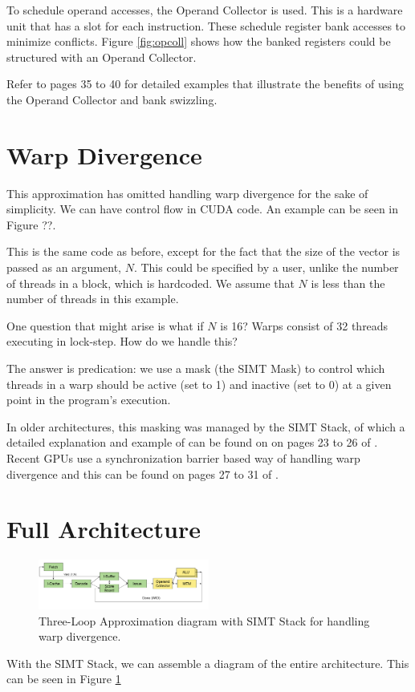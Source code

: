 To schedule operand accesses, the Operand Collector is used. This is a hardware unit that
has a slot for each instruction. These schedule register bank accesses to minimize conflicts.
Figure \ref{fig:opcoll} shows how the banked registers could be structured with an Operand Collector.

Refer to \cite{aamodt2018general} pages 35 to 40 for detailed examples that illustrate the benefits of using
the Operand Collector and bank swizzling.

\section{Warp Divergence}

This approximation has omitted handling warp divergence for the sake of simplicity.
We can have control flow in CUDA code. An example can be seen in Figure ??.

This is the same code as before, except for the fact that the size of the vector is passed
as an argument, $N$. This could be specified by a user, unlike the number of threads in a block,
which is hardcoded. We assume that $N$ is less than the number of threads in this example.

One question that might arise is what if $N$ is 16? Warps consist of 32 threads
executing in lock-step. How do we handle this?

The answer is predication: we use a mask (the SIMT Mask) to control which threads in a warp
should be active (set to 1) and inactive (set to 0) at a given point in the program's execution.

In older architectures, this masking was managed by the SIMT Stack, of which
a detailed explanation and example of can be found on
on pages 23 to 26 of \cite{aamodt2018general}. Recent GPUs use a synchronization barrier based
way of handling warp divergence and this can be found on pages 27 to 31 of \cite{aamodt2018general}.

\section{Full Architecture}


\begin{figure}[h]
    \centering
    \includegraphics[width=0.5\textwidth]{assets/3.png}
    \caption{Three-Loop Approximation diagram with SIMT Stack for handling warp divergence.}
    \label{fig:warpthreeloop}
\end{figure}

With the SIMT Stack, we can assemble a diagram of the entire architecture.
This can be seen in Figure \ref{fig:warpthreeloop} 
